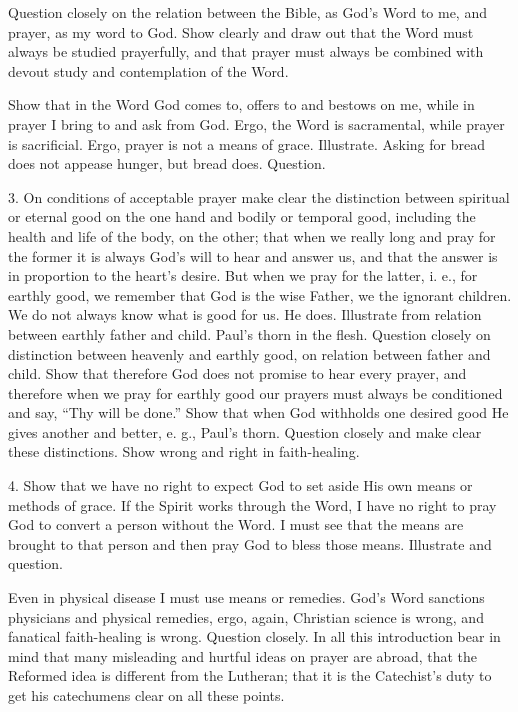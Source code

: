  Question closely on the relation between the Bible, as God’s Word to me, and prayer, as my word to God. Show clearly and draw out that the Word must always be studied prayerfully, and that prayer must always be combined with devout study and contemplation of the Word.

Show that in the Word God comes to, offers to and bestows on me, while in prayer I bring to and ask from God. Ergo, the Word is sacramental, while prayer is sacrificial. Ergo, prayer is not a means of grace. Illustrate. Asking for bread does not appease hunger, but bread does. Question.

 3. On conditions of acceptable prayer make clear the distinction between spiritual or eternal good on the one hand and bodily or temporal good, including the health and life of the body, on the other; that when we really long and pray for the former it is always God’s will to hear and answer us, and that the answer is in proportion to the heart’s desire. But when we pray for the latter, i. e., for earthly good, we remember that God is the wise Father, we the ignorant children. We do not always know what is good for us. He does. Illustrate from relation between earthly father and child. Paul’s thorn in the flesh. Question closely on distinction between heavenly and earthly good, on relation between father and child.
Show that therefore God does not promise to hear every prayer, and therefore when we pray for earthly good our prayers must always be conditioned and say, “Thy will be done.” Show that when God withholds one desired good He gives another and better, e. g., Paul’s thorn. Question closely and make clear these distinctions. Show wrong and right in faith-healing.

 4. Show that we have no right to expect God to set aside His own means or methods of grace. If the Spirit works through the Word, I have no right to pray God to convert a person without the Word. I must see that the means are brought to that person and then pray God to bless those means. Illustrate and question.

Even in physical disease I must use means or remedies. God’s Word sanctions physicians and physical remedies, ergo, again, Christian science is wrong, and fanatical faith-healing is wrong. Question closely. In all this introduction bear in mind that many misleading and hurtful ideas on prayer are abroad, that the Reformed idea is different from the Lutheran; that it is the Catechist’s duty to get his catechumens clear on all these points.

